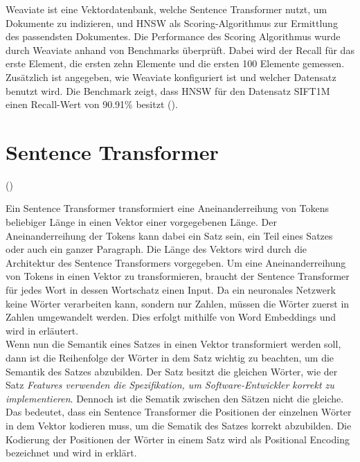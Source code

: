 
Weaviate ist eine Vektordatenbank, welche Sentence Transformer nutzt, um Dokumente zu indizieren, und HNSW als Scoring-Algorithmus zur Ermittlung des passendsten Dokumentes.
Die Performance des Scoring Algorithmus wurde durch Weaviate anhand von Benchmarks überprüft.
Dabei wird der Recall für das erste Element, die ersten zehn Elemente und die ersten 100 Elemente gemessen.
Zusätzlich ist angegeben, wie Weaviate konfiguriert ist und welcher Datensatz benutzt wird.
Die Benchmark zeigt, dass HNSW für den Datensatz SIFT1M einen Recall-Wert von 90.91\% besitzt (\cite{Weaviate_Benchmark}).

\section{Sentence Transformer}
\label{chap:sentence-transformer}
 (\cite{Reimers_Gurevych_2019})

 Ein Sentence Transformer transformiert eine Aneinanderreihung von Tokens beliebiger Länge in einen Vektor einer vorgegebenen Länge.
 Der Aneinanderreihung der Tokens kann dabei ein Satz sein, ein Teil eines Satzes oder auch ein ganzer Paragraph.
 Die Länge des Vektors wird durch die Architektur des Sentence Transformers vorgegeben.
 Um eine Aneinanderreihung von Tokens in einen Vektor zu transformieren, braucht der Sentence Transformer für jedes Wort in dessen Wortschatz einen Input.
 Da ein neuronales Netzwerk keine Wörter verarbeiten kann, sondern nur Zahlen, müssen die Wörter zuerst in Zahlen umgewandelt werden.
 Dies erfolgt mithilfe von Word Embeddings und wird in  erläutert.\\
 
 Wenn nun die Semantik eines Satzes in einen Vektor transformiert werden soll, dann ist die Reihenfolge der Wörter in dem Satz wichtig zu beachten, um die Semantik des Satzes abzubilden.
 Der Satz  besitzt die gleichen Wörter, wie der Satz \textit{Features verwenden die Spezifikation, um Software-Entwickler korrekt zu implementieren}.
 Dennoch ist die Sematik zwischen den Sätzen nicht die gleiche.
 Das bedeutet, dass ein Sentence Transformer die Positionen der einzelnen Wörter in dem Vektor kodieren muss, um die Sematik des Satzes korrekt abzubilden.
 Die Kodierung der Positionen der Wörter in einem Satz wird als Positional Encoding bezeichnet und wird in  erklärt.

